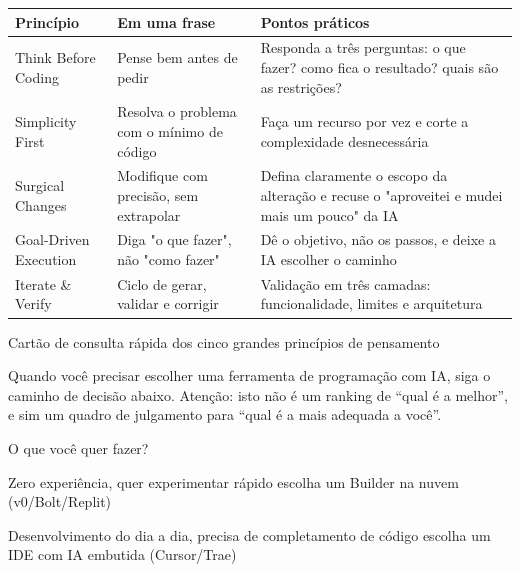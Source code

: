


\begin{center}
\begin{tabularx}{\linewidth}{|X|X|X|}
\hline
\textbf{Princípio} & \textbf{Em uma frase} & \textbf{Pontos práticos} \tabularnewline
\hline
Think Before Coding & Pense bem antes de pedir & Responda a três perguntas: o que fazer? como fica o resultado? quais são as restrições? \tabularnewline
Simplicity First & Resolva o problema com o mínimo de código & Faça um recurso por vez e corte a complexidade desnecessária \tabularnewline
Surgical Changes & Modifique com precisão, sem extrapolar & Defina claramente o escopo da alteração e recuse o "aproveitei e mudei mais um pouco" da IA \tabularnewline
Goal-Driven Execution & Diga "o que fazer", não "como fazer" & Dê o objetivo, não os passos, e deixe a IA escolher o caminho \tabularnewline
Iterate \& Verify & Ciclo de gerar, validar e corrigir & Validação em três camadas: funcionalidade, limites e arquitetura \tabularnewline
\hline
\end{tabularx}
\end{center}

\begin{center}\small\color{gray}Cartão de consulta rápida dos cinco grandes princípios de pensamento\end{center}


Quando você precisar escolher uma ferramenta de programação com IA, siga o caminho de decisão abaixo. Atenção: isto não é um ranking de “qual é a melhor”, e sim um quadro de julgamento para “qual é a mais adequada a você”.

O que você quer fazer?

Zero experiência, quer experimentar rápido escolha um Builder na nuvem (v0/Bolt/Replit)

Desenvolvimento do dia a dia, precisa de completamento de código escolha um IDE com IA embutida (Cursor/Trae)

